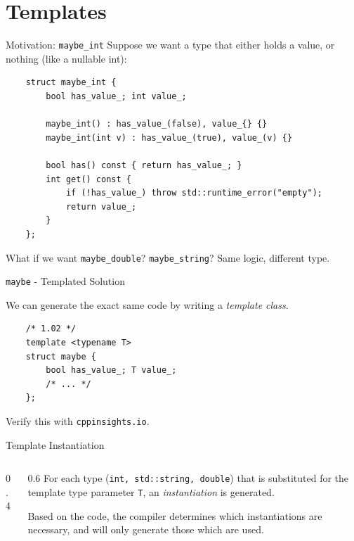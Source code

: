 \section{Templates}

\begin{frame}[fragile]{Motivation: \texttt{maybe\_int}}
  Suppose we want a type that either holds a value, or nothing (like a nullable int):
  \begin{verbatim}
    struct maybe_int {
        bool has_value_; int value_;

        maybe_int() : has_value_(false), value_{} {}
        maybe_int(int v) : has_value_(true), value_(v) {}

        bool has() const { return has_value_; }
        int get() const {
            if (!has_value_) throw std::runtime_error("empty");
            return value_;
        }
    };
  \end{verbatim}
  What if we want \texttt{maybe\_double}? \texttt{maybe\_string}? Same logic, different type.
\end{frame}

\begin{frame}[fragile]{\texttt{maybe} - Templated Solution}
  \begin{sqt:result}
    We can generate the exact same code by writing a \emph{template class}.
  \end{sqt:result}

  \begin{verbatim}
    /* 1.02 */
    template <typename T>
    struct maybe {
        bool has_value_; T value_;
        /* ... */
    };
  \end{verbatim}

  Verify this with \verb|cppinsights.io|. \\
\end{frame}

\begin{frame}[fragile]{Template Instantiation}
  \begin{columns}[T]
    \begin{column}{0.4\textwidth}
      
    \end{column}
    \begin{column}{0.6\textwidth}
      \vspace{1cm}
      For each type (\texttt{int, std::string, double}) that is substituted for
      the template type parameter \texttt{T}, 
      an \emph{instantiation} is generated.

      Based on the code, the compiler determines which instantiations are necessary,
      and will only generate those which are used.
    \end{column}
  \end{columns}
\end{frame}

